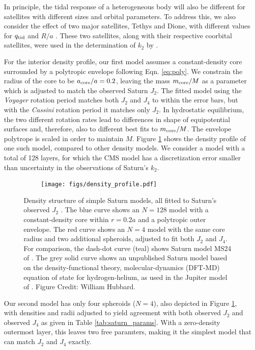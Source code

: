 In principle, the tidal response of a heterogeneous body will also be different for
satellites with different sizes and orbital parameters. To address this, we also
consider the effect of two major satellites, Tethys and Dione, with different values
for $q_{\rm tid}$ and $R/a$ \citep{archinal2011}. These two satellites, along with
their respective coorbital satellites, were used in the determination of $k_2$ by
\citet{lainey2016}.

For the interior density profile, our first model assumes a constant-density
core surrounded by a polytropic envelope following Eqn. \eqref{eq:poly}. We
constrain the radius of the core to be $a_{\rm core}/a=0.2$, leaving the mass
$m_{\rm core}/M$ as a parameter which is adjusted to match the observed Saturn
$J_2$.  The fitted model using the \textit{Voyager} rotation period matches
both $J_2$ and $J_4$ to within the error bars, but with the \textit{Cassini}
rotation period it matches only $J_2$.  In hydrostatic equilibrium, the two
different rotation rates lead to differences in shape of equipotential surfaces
and, therefore, also to different best fits to $m_{\rm core}/M$. The envelope
polytrope is scaled in order to maintain $M$. Figure
\ref{fig:density_structure} shows the density profile of one such model,
compared to other density models. We consider a model with a total of 128
layers, for which the CMS model has a discretization error \citep{wisdom2016}
smaller than uncertainty in the observations of Saturn's $k_2$.

\begin{figure}[h!]  
  \centering
    \texttt{[image: figs/density\_profile.pdf]} \caption{ 
Density structure of simple Saturn models, all fitted to Saturn's observed
$J_2$ \citep{Jacobson2006}.  The blue curve shows an $N=128$ model with a
constant-density core within $r=0.2 a$ and a polytropic outer envelope.  The
red curve shows an $N=4$ model with the same core radius and two additional
spheroids, adjusted to fit both $J_2$ and $J_4$.  For comparison, the dash-dot
curve (teal) shows Saturn model MS24 of \citet{gudkova1999}.  The grey solid
curve shows an unpublished Saturn model based on the density-functional theory,
molecular-dynamics (DFT-MD) equation of state for hydrogen-helium, as used in
the Jupiter model of \citet{hubbard2016}. Figure Credit: William Hubbard.
}
\label{fig:density_structure}
\end{figure}

Our second model has only four spheroids ($N=4$), also depicted in Figure
\ref{fig:density_structure}, with densities and radii adjusted to yield agreement
with both observed $J_2$ and observed $J_4$ as given in Table
\ref{tab:saturn_params}. With a zero-density outermost layer, this leaves two free
paramters, making it the simplest model that can match $J_2$ and $J_4$ exactly.


